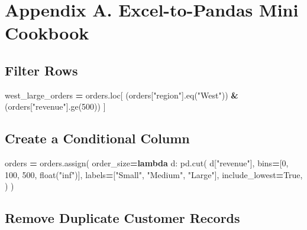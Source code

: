 \documentclass[
  12pt,
]{article}
\newenvironment{Shaded}{\begin{snugshade}}{\end{snugshade}}
\newcommand{\BuiltInTok}[1]{#1}
\newcommand{\DecValTok}[1]{\textcolor[rgb]{0.00,0.00,0.81}{#1}}
\newcommand{\KeywordTok}[1]{\textcolor[rgb]{0.13,0.29,0.53}{\textbf{#1}}}
\newcommand{\NormalTok}[1]{#1}
\newcommand{\OperatorTok}[1]{\textcolor[rgb]{0.81,0.36,0.00}{\textbf{#1}}}
\newcommand{\StringTok}[1]{\textcolor[rgb]{0.31,0.60,0.02}{#1}}
\newcommand{\VariableTok}[1]{\textcolor[rgb]{0.00,0.00,0.00}{#1}}
\begin{document}
\section{Appendix A. Excel-to-Pandas Mini
Cookbook}\label{appendix-a.-excel-to-pandas-mini-cookbook}

\subsection{Filter Rows}\label{filter-rows}

\begin{Shaded}
\begin{Highlighting}[]
\NormalTok{west\_large\_orders }\OperatorTok{=}\NormalTok{ orders.loc[}
\NormalTok{    (orders[}\StringTok{"region"}\NormalTok{].eq(}\StringTok{"West"}\NormalTok{)) }\OperatorTok{\&}\NormalTok{ (orders[}\StringTok{"revenue"}\NormalTok{].ge(}\DecValTok{500}\NormalTok{))}
\NormalTok{]}
\end{Highlighting}
\end{Shaded}

\subsection{Create a Conditional
Column}\label{create-a-conditional-column}

\begin{Shaded}
\begin{Highlighting}[]
\NormalTok{orders }\OperatorTok{=}\NormalTok{ orders.assign(}
\NormalTok{    order\_size}\OperatorTok{=}\KeywordTok{lambda}\NormalTok{ d: pd.cut(}
\NormalTok{        d[}\StringTok{"revenue"}\NormalTok{],}
\NormalTok{        bins}\OperatorTok{=}\NormalTok{[}\DecValTok{0}\NormalTok{, }\DecValTok{100}\NormalTok{, }\DecValTok{500}\NormalTok{, }\BuiltInTok{float}\NormalTok{(}\StringTok{"inf"}\NormalTok{)],}
\NormalTok{        labels}\OperatorTok{=}\NormalTok{[}\StringTok{"Small"}\NormalTok{, }\StringTok{"Medium"}\NormalTok{, }\StringTok{"Large"}\NormalTok{],}
\NormalTok{        include\_lowest}\OperatorTok{=}\VariableTok{True}\NormalTok{,}
\NormalTok{    )}
\NormalTok{)}
\end{Highlighting}
\end{Shaded}

\subsection{Remove Duplicate Customer
Records}\label{remove-duplicate-customer-records}
\end{document}
